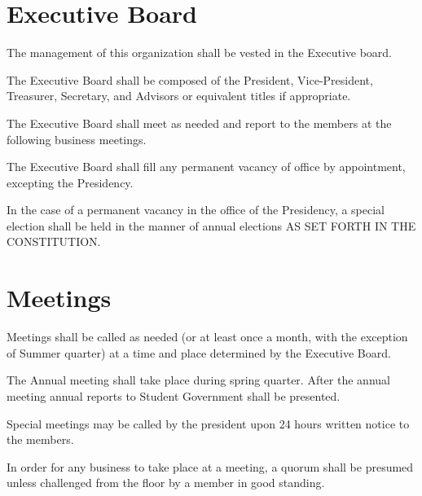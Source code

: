 \section{Executive Board}
\begin{subroutines}
\item The management of this organization shall be vested in the Executive board.
\item The Executive Board shall be composed of the President, Vice-President, Treasurer, Secretary, and Advisors or equivalent titles if appropriate.
\item The Executive Board shall meet as needed and report to the members at the following business meetings.
\item The Executive Board shall fill any permanent vacancy of office by appointment, excepting the Presidency.
\item In the case of a permanent vacancy in the office of the Presidency, a special election shall be held in the manner of annual elections AS SET FORTH IN THE CONSTITUTION.
\end{subroutines}

\section{Meetings}
\begin{subroutines}
\item Meetings shall be called as needed (or at least once a month, with the exception of Summer quarter) at a time and place determined by the Executive Board.
\item The Annual meeting shall take place during spring quarter.  After the annual meeting annual reports to Student Government shall be presented.
\item Special meetings may be called by the president upon 24 hours written notice to the members.
\item In order for any business to take place at a meeting, a quorum shall be presumed unless challenged from the floor by a member in good standing.
\end{subroutines}

